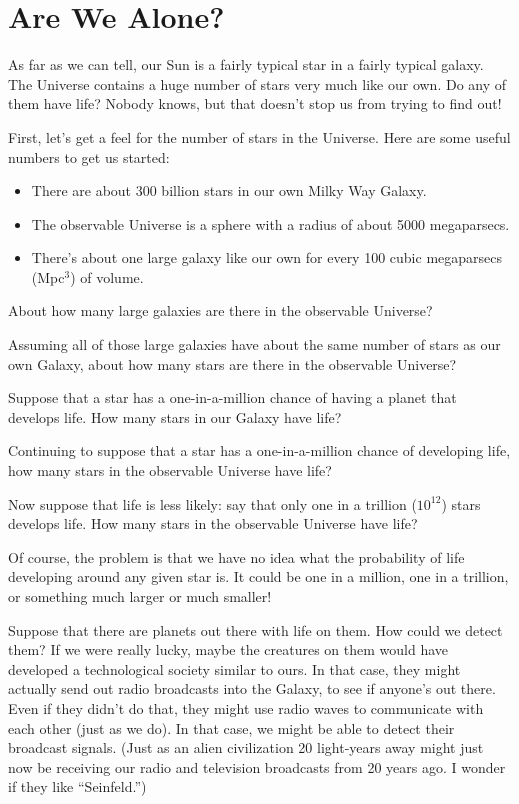 \chapter{Are We Alone?}


As far as we can tell, our Sun is a fairly typical star in a fairly
typical galaxy.  The Universe contains a huge number of stars very much
like our own.  Do any of them have life?  Nobody knows, but that doesn't
stop us from trying to find out!

First, let's get a feel for the number of stars in the Universe.
Here are some useful numbers to get us started:

\begin{itemize}
\item There are about 300 billion stars in our own Milky Way Galaxy.
\item The observable Universe is a sphere with a radius of about
5000 megaparsecs.
\item There's about one large galaxy like our own for every 100 cubic
megaparsecs (Mpc$^3$) of volume.
\end{itemize}

About how many large galaxies are there in the observable Universe?

\vskip 1.5in

Assuming all of those large galaxies have about the same number
of stars as our own Galaxy, about how many stars are there in the
observable Universe?

\vskip 1in

Suppose that a star has a one-in-a-million chance of having
a planet that develops life.
How many stars in our Galaxy have life?

\newpage

Continuing to suppose that a star has a one-in-a-million chance
of developing life, how many stars in the observable Universe have life?

\vskip 1in

Now suppose that life is less likely: say that only one in a trillion
($10^{12}$) stars develops life.  How many stars in the observable Universe
have life?

\vskip 1in

Of course, the problem is that we have no idea what the probability
of life developing around any given star is.  It could be
one in a million, one in a trillion, or something much larger or much smaller!

Suppose that there are planets out there with life on them.  How could we
detect them?  If we were really lucky, maybe the creatures on them
would have developed a technological society similar to ours.  
In that case, they might actually send out radio broadcasts
into the Galaxy, to see if anyone's out there.  Even if they
didn't do that, 
they might use radio waves to communicate with each other (just 
as we do).  In that case, we
might be able to detect their broadcast signals.  (Just as an alien
civilization 20 light-years away might just now be receiving our radio
and television broadcasts from 20 years ago.  I wonder if they like
``Seinfeld.'')


